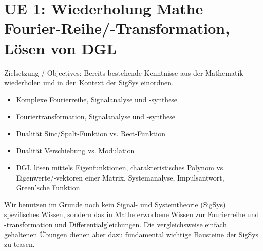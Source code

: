 
\newpage
\section{UE 1: Wiederholung Mathe Fourier-Reihe/-Transformation, Lösen von DGL}
Zielsetzung / Objectives: Bereits bestehende Kenntnisse aus der Mathematik
wiederholen und in den Kontext der SigSys einordnen.

\begin{itemize}
\item Komplexe Fourierreihe, Signalanalyse und -synthese
\item Fouriertransformation, Signalanalyse und -synthese
\item Dualität Sinc/Spalt-Funktion vs. Rect-Funktion
\item Dualität Verschiebung vs. Modulation
\item DGL lösen mittels Eigenfunktionen, charakteristisches Polynom vs. Eigenwerte/-vektoren einer Matrix, Systemanalyse, Impulsantwort, Green'sche Funktion
\end{itemize}
%
Wir benutzen im Grunde noch kein Signal- und Systemtheorie (SigSys) spezifisches Wissen,
sondern das in Mathe erworbene Wissen zur Fourierreihe und -transformation
und Differentialgleichungen. Die vergleichsweise einfach gehaltenen
Übungen dienen aber dazu fundamental wichtige Bausteine der SigSys zu teasen.


\newpage
